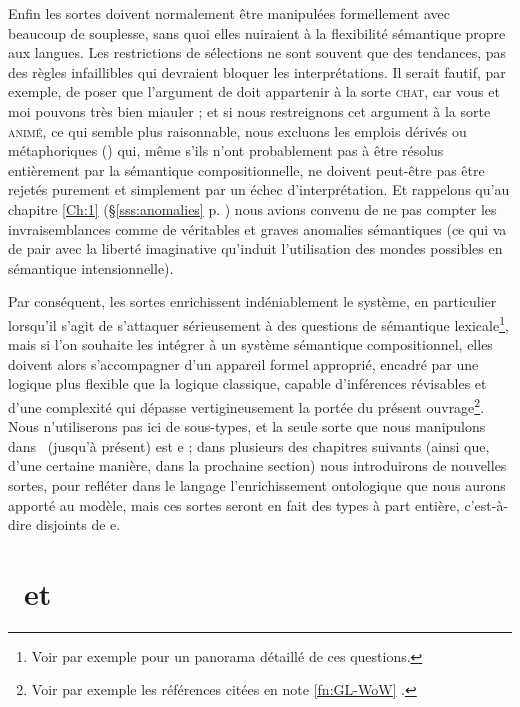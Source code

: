 Enfin les sortes doivent normalement être manipulées formellement avec beaucoup de souplesse, sans quoi elles nuiraient à la flexibilité sémantique propre aux langues.  Les restrictions de sélections ne sont souvent que des tendances, pas des règles infaillibles qui devraient bloquer les interprétations.  Il serait fautif, par exemple, de poser que l'argument de  doit appartenir à la sorte \textsc{chat}, car vous et moi pouvons très bien miauler ; et si nous restreignons cet argument à la sorte \textsc{animé}, ce qui semble plus raisonnable, nous excluons les emplois dérivés ou  métaphoriques ()  qui, même s'ils n'ont probablement pas à être résolus entièrement par la sémantique compositionnelle, ne doivent peut-être pas être rejetés purement et simplement par un échec d'interprétation.  Et rappelons qu'au chapitre \ref{Ch:1} (\S\ref{sss:anomalies} p. \pageref{x:anom}) nous avions convenu de ne pas compter les invraisemblances comme de véritables et graves anomalies sémantiques (ce qui va de pair avec la liberté imaginative qu'induit l'utilisation des mondes possibles en sémantique intensionnelle).

Par conséquent, les sortes enrichissent indéniablement le système, en particulier lorsqu'il s'agit de s'attaquer sérieusement à des questions de sémantique lexicale\footnote{Voir par exemple \citet{Kleiber:99} pour un panorama détaillé de ces questions.}, mais si l'on souhaite les intégrer à un système sémantique compositionnel, elles doivent alors s'accompagner d'un appareil formel approprié, encadré par une logique plus flexible que la logique classique, capable d'inférences révisables et d'une complexité qui dépasse vertigineusement la portée du présent ouvrage\footnote{Voir par exemple les références citées en note \ref{fn:GL-WoW} .}.  Nous n'utiliserons pas ici de sous-types, et la seule sorte que nous manipulons dans \LO\ (jusqu'à présent) est \typ e ;  dans plusieurs des chapitres suivants (ainsi que, d'une certaine manière, dans la prochaine section) nous introduirons de nouvelles sortes, pour refléter dans le langage l'enrichissement ontologique que nous aurons apporté au modèle, mais ces sortes seront en fait des types à part entière, c'est-à-dire disjoints de \typ e.






\section{\Tyz\ et \LOz}
\label{s:Ty2}


